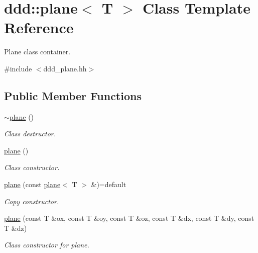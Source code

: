 \hypertarget{classddd_1_1plane}{}\section{ddd\+:\+:plane$<$ T $>$ Class Template Reference}
\label{classddd_1_1plane}


Plane class container.  




{\ttfamily \#include $<$ddd\+\_\+plane.\+hh$>$}

\subsection*{Public Member Functions}
\begin{DoxyCompactItemize}
\item 
\mbox{\label{classddd_1_1plane_aeaeb43102be169cd96f64a36d594dc30}} 
\hyperlink{classddd_1_1plane_aeaeb43102be169cd96f64a36d594dc30}{$\sim$plane} ()
\begin{DoxyCompactList}\small\item\em Class destructor. \end{DoxyCompactList}\item 
\mbox{\label{classddd_1_1plane_a4c3295ab6713fdcd2af22ca1d1072b36}} 
\hyperlink{classddd_1_1plane_a4c3295ab6713fdcd2af22ca1d1072b36}{plane} ()
\begin{DoxyCompactList}\small\item\em Class constructor. \end{DoxyCompactList}\item 
\mbox{\label{classddd_1_1plane_a52ed398bc1781834fde8b17ae329aefc}} 
\hyperlink{classddd_1_1plane_a52ed398bc1781834fde8b17ae329aefc}{plane} (const \hyperlink{classddd_1_1plane}{plane}$<$ T $>$ \&)=default
\begin{DoxyCompactList}\small\item\em Copy constructor. \end{DoxyCompactList}\item 
\mbox{\label{classddd_1_1plane_a7cfa130fe8baa684c5afd09300c7b35f}} 
\hyperlink{classddd_1_1plane_a7cfa130fe8baa684c5afd09300c7b35f}{plane} (const T \&ox, const T \&oy, const T \&oz, const T \&dx, const T \&dy, const T \&dz)
\begin{DoxyCompactList}\small\item\em Class constructor for plane. \end{DoxyCompactList}\item 

\end{DoxyCompactItemize}
